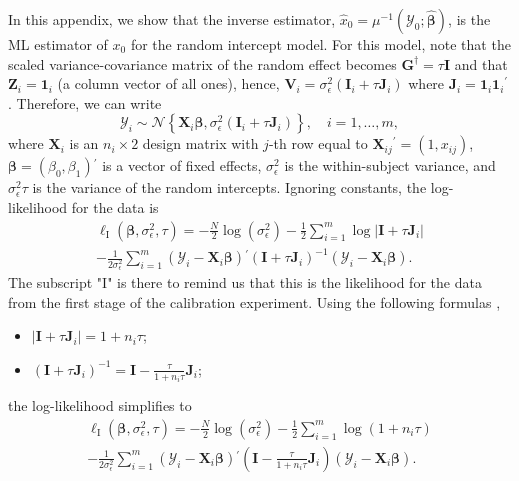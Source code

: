 \documentclass{article}\usepackage[]{graphicx}\usepackage[]{color}
\newcommand{\trans}{\ensuremath{^\prime}}
\newcommand{\X}{\ensuremath{\bm{X}}}
\newcommand{\Z}{\ensuremath{\bm{Z}}}
\begin{document}
In this appendix, we show that the inverse estimator, $\widehat{x}_0 = \mu^{-1}\left(\mathcal{Y}_0; \widehat{\bm{\beta}}\right)$, is the ML estimator of $x_0$ for the random intercept model. For this model, note that the scaled variance-covariance matrix of the random effect becomes $\bm{G}^\dagger = \tau\bm{I}$ and that $\Z_i = \bm{1}_i$ (a column vector of all ones), hence, $\bm{V}_i = \sigma_\epsilon^2\left(\bm{I}_i + \tau\bm{J}_i\right)$ where $\bm{J}_i = \bm{1}_i\bm{1}_i\trans$. Therefore, we can write
\[
  \bm{\mathcal{Y}}_i \sim \mathcal{N}\left\{\X_i\bm{\beta}, \sigma_\epsilon^2\left(\bm{I}_i + \tau\bm{J}_i\right)\right\}, \quad i = 1, \dotsc, m,
\]
where $\X_i$ is an $n_i \times 2$ design matrix with $j$-th row equal to $\X_{ij}\trans = \left(1, x_{ij}\right)$, $\bm{\beta} = \left(\beta_0, \beta_1\right)\trans$ is a vector of fixed effects, $\sigma_\epsilon^2$ is the within-subject variance, and $\sigma_\epsilon^2\tau$ is the variance of the random intercepts. Ignoring constants, the log-likelihood for the data is
\begin{multline*}
  \ell_{\mathrm{I}}\left(\bm{\beta}, \sigma_\epsilon^2, \tau\right) = -\frac{N}{2}\log\left(\sigma_\epsilon^2\right) - \frac{1}{2}\sum_{i = 1}^m \log\left|\bm{I} + \tau\bm{J}_i\right| \\ - \frac{1}{2\sigma_\epsilon^2}\sum_{i = 1}^m \left(\bm{\mathcal{Y}}_i - \X_i\bm{\beta}\right)\trans\left(\bm{I} + \tau\bm{J}_i\right)^{-1}\left(\bm{\mathcal{Y}}_i - \X_i\bm{\beta}\right).
\end{multline*}
The subscript "$\mathrm{I}$" is there to remind us that this is the likelihood for the data from the first stage of the calibration experiment. Using the following formulas \citep[pg. 49]{demidenko_mixed_2013},
\begin{itemize}
  \item $\left|\bm{I} + \tau\bm{J}_i\right| = 1 + n_i\tau$;
  \item $\left(\bm{I} + \tau\bm{J}_i\right)^{-1} = \bm{I} - \frac{\tau}{1 + n_i\tau}\bm{J}_i$;
\end{itemize}
the log-likelihood simplifies to
\begin{multline*}
  \ell_{\mathrm{I}}\left(\bm{\beta}, \sigma_\epsilon^2, \tau\right) = -\frac{N}{2}\log\left(\sigma_\epsilon^2\right) - \frac{1}{2}\sum_{i = 1}^m \log\left(1 + n_i\tau\right) \\ - \frac{1}{2\sigma_\epsilon^2}\sum_{i = 1}^m \left(\bm{\mathcal{Y}}_i - \X_i\bm{\beta}\right)\trans\left(\bm{I} - \frac{\tau}{1 + n_i\tau}\bm{J}_i\right)\left(\bm{\mathcal{Y}}_i - \X_i\bm{\beta}\right).
\end{multline*}
\end{document}
